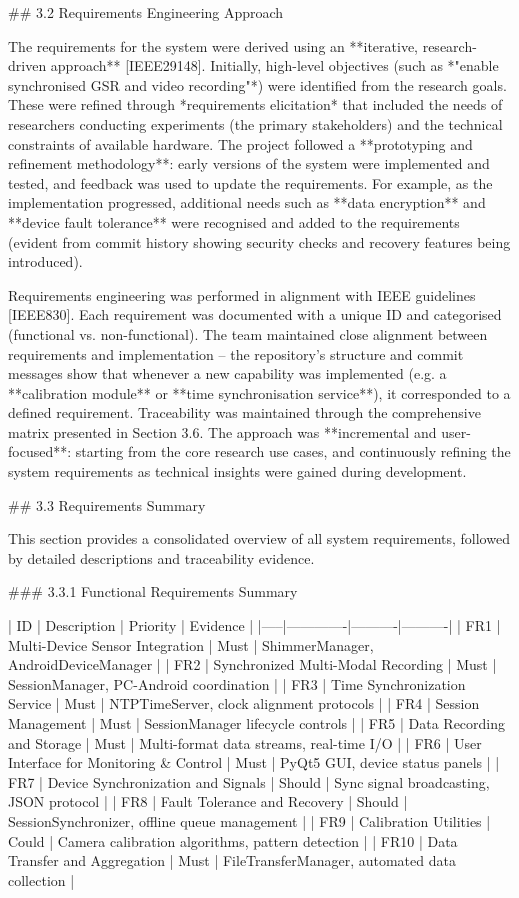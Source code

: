 \documentclass[12pt,a4paper]{article}
\begin{document}
## 3.2 Requirements Engineering Approach

The requirements for the system were derived using an **iterative, research-driven approach** [IEEE29148]. Initially, high-level objectives (such as *"enable synchronised GSR and video recording"*) were identified from the research goals. These were refined through *requirements elicitation* that included the needs of researchers conducting experiments (the primary stakeholders) and the technical constraints of available hardware. The project followed a **prototyping and refinement methodology**: early versions of the system were implemented and tested, and feedback was used to update the requirements. For example, as the implementation progressed, additional needs such as **data encryption** and **device fault tolerance** were recognised and added to the requirements (evident from commit history showing security checks and recovery features being introduced).

Requirements engineering was performed in alignment with IEEE guidelines [IEEE830]. Each requirement was documented with a unique ID and categorised (functional vs. non-functional). The team maintained close alignment between requirements and implementation -- the repository's structure and commit messages show that whenever a new capability was implemented (e.g. a **calibration module** or **time synchronisation service**), it corresponded to a defined requirement. Traceability was maintained through the comprehensive matrix presented in Section 3.6. The approach was **incremental and user-focused**: starting from the core research use cases, and continuously refining the system requirements as technical insights were gained during development.

## 3.3 Requirements Summary

This section provides a consolidated overview of all system requirements, followed by detailed descriptions and traceability evidence.

### 3.3.1 Functional Requirements Summary

| ID  | Description | Priority | Evidence |
|-----|-------------|----------|----------|
| FR1 | Multi-Device Sensor Integration | Must | ShimmerManager, AndroidDeviceManager |
| FR2 | Synchronized Multi-Modal Recording | Must | SessionManager, PC-Android coordination |
| FR3 | Time Synchronization Service | Must | NTPTimeServer, clock alignment protocols |
| FR4 | Session Management | Must | SessionManager lifecycle controls |
| FR5 | Data Recording and Storage | Must | Multi-format data streams, real-time I/O |
| FR6 | User Interface for Monitoring & Control | Must | PyQt5 GUI, device status panels |
| FR7 | Device Synchronization and Signals | Should | Sync signal broadcasting, JSON protocol |
| FR8 | Fault Tolerance and Recovery | Should | SessionSynchronizer, offline queue management |
| FR9 | Calibration Utilities | Could | Camera calibration algorithms, pattern detection |
| FR10 | Data Transfer and Aggregation | Must | FileTransferManager, automated data collection |
\end{document}
